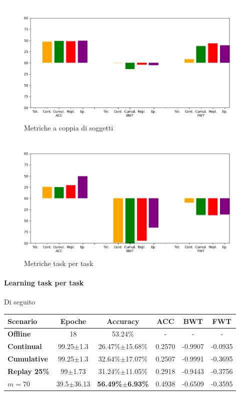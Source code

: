 \documentclass[11pt, a4paper, twoside, openright]{book}
\begin{document}
\begin{figure}[h]
    \centering
    \includegraphics[scale=0.6]{img/autotest_20210701/autotest_GRU_accbwtfwt.png}
    \caption{Metriche a coppia di soggetti}
    \label{fig:autotest_GRU_accbwtfwt}
\end{figure}
\begin{figure}[h]
    \centering
    \includegraphics[scale=0.6]{img/autotest_20210701/autotest_task_GRU_accbwtfwt.png}
    \caption{Metriche task per task}
    \label{fig:autotest_task_GRU}
\end{figure}
\paragraph{Learning task per task} Di seguito\\
\begin{tabular}{l|c|c|c|c|c}
    \textbf{Scenario} & \textbf{Epoche} & \textbf{Accuracy} & \textbf{ACC} & \textbf{BWT} & \textbf{FWT} \\
    \hline 
    \textbf{Offline} & 18 & 53.24\% & - & - & - \\
    \textbf{Continual} & 99.25$\pm$1.3 & 26.47\%$\pm$15.68\% & 0.2570 & -0.9907 & -0.0935\\
    \textbf{Cumulative} & 99.25$\pm$1.3 & 32.64\%$\pm$17.07\% & 0.2507 & -0.9991 & -0.3695\\
    \textbf{Replay 25\%} & 99$\pm$1.73 & 31.24\%$\pm$11.05\% & 0.2918 & -0.9443 & -0.3756\\
    \textbf{$m = 70$} & 39.5$\pm$36.13 & \textbf{56.49\%$\pm$6.93\%} & 0.4938 & -0.6509 & -0.3595\\
\end{tabular}
\end{document}
